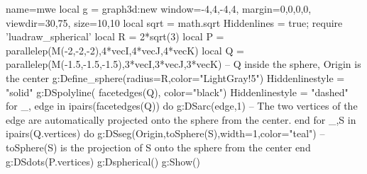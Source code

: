 \documentclass[border=5pt]{standalone}
\begin{document}
\begin{luadraw}{name=mwe}
    local g = graph3d:new{
        window={-4,4,-4,4},
        margin={0,0,0,0},
        viewdir={30,75},
        size={10,10}
    } 
    local sqrt = math.sqrt
    Hiddenlines = true; 
    require 'luadraw_spherical'
    local R = 2*sqrt(3)
    local P = parallelep(M(-2,-2,-2),4*vecI,4*vecJ,4*vecK)
    local Q = parallelep(M(-1.5,-1.5,-1.5),3*vecI,3*vecJ,3*vecK) -- Q inside the sphere, Origin is the center
    g:Define_sphere({radius=R,color="LightGray!5"})
    Hiddenlinestyle = "solid"
    g:DSpolyline( facetedges(Q), {color="black"})
    Hiddenlinestyle = "dashed"
    for _, edge in ipairs(facetedges(Q)) do
        g:DSarc(edge,1) -- The two vertices of the edge are automatically projected onto the sphere from the center.
    end
    for _,S in ipairs(Q.vertices) do
        g:DSseg({Origin,toSphere(S)},{width=1,color="teal"}) -- toSphere(S) is the projection of S onto the sphere from the center 
    end
    g:DSdots(P.vertices)
    g:Dspherical()
    g:Show()
\end{luadraw}
\end{document}
